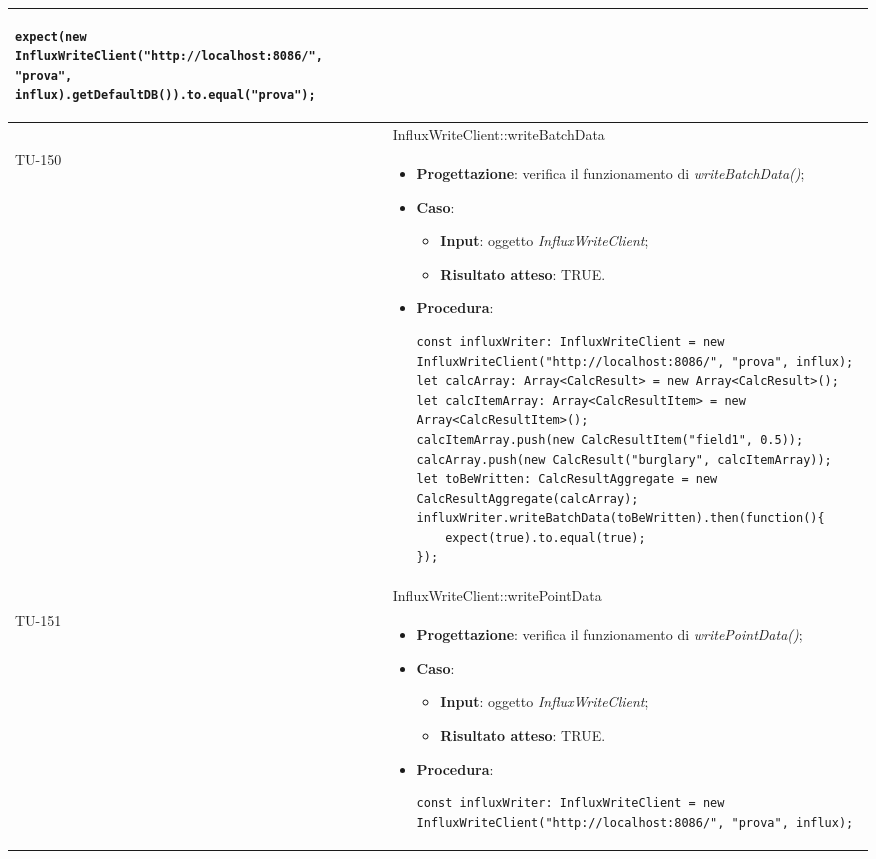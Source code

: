 \begin{longtable}{|C{1.5cm}|C{14.5cm}|}
\begin{itemize}
\begin{lstlisting}
expect(new InfluxWriteClient("http://localhost:8086/", "prova", influx).getDefaultDB()).to.equal("prova");
	\end{lstlisting}
\end{itemize}\\
\hline
{} & InfluxWriteClient::writeBatchData
\\ \hline
{TU-150} &
\begin{itemize}
	\item \textbf{Progettazione}: verifica il funzionamento di \emph{writeBatchData()};
	\item \textbf{Caso}: 
	\begin{itemize}
		\item \textbf{Input}: oggetto \emph{InfluxWriteClient};
		\item \textbf{Risultato atteso}: TRUE.
	\end{itemize}
	\item \textbf{Procedura}:
	\begin{lstlisting}
const influxWriter: InfluxWriteClient = new InfluxWriteClient("http://localhost:8086/", "prova", influx);
let calcArray: Array<CalcResult> = new Array<CalcResult>();
let calcItemArray: Array<CalcResultItem> = new Array<CalcResultItem>();
calcItemArray.push(new CalcResultItem("field1", 0.5));
calcArray.push(new CalcResult("burglary", calcItemArray)); 
let toBeWritten: CalcResultAggregate = new CalcResultAggregate(calcArray);
influxWriter.writeBatchData(toBeWritten).then(function(){
	expect(true).to.equal(true);
});
	\end{lstlisting}
\end{itemize}\\
\hline
{} & InfluxWriteClient::writePointData
\\ \hline
{TU-151} &
\begin{itemize}
	\item \textbf{Progettazione}: verifica il funzionamento di \emph{writePointData()};
	\item \textbf{Caso}: 
	\begin{itemize}
		\item \textbf{Input}: oggetto \emph{InfluxWriteClient};
		\item \textbf{Risultato atteso}: TRUE.
	\end{itemize}
	\item \textbf{Procedura}:
	\begin{lstlisting}
const influxWriter: InfluxWriteClient = new InfluxWriteClient("http://localhost:8086/", "prova", influx);

\end{lstlisting}
\end{itemize}
\end{longtable}
